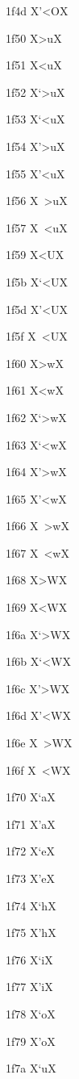 \documentclass[11pt]{article}
\begin{document}
1f4d X{\textgreek{'<O}}X

1f50 X{\textgreek{>u}}X

1f51 X{\textgreek{<u}}X

1f52 X{\textgreek{`>u}}X

1f53 X{\textgreek{`<u}}X

1f54 X{\textgreek{'>u}}X

1f55 X{\textgreek{'<u}}X

1f56 X{\textgreek{~>u}}X

1f57 X{\textgreek{~<u}}X

1f59 X{\textgreek{<U}}X

1f5b X{\textgreek{`<U}}X

1f5d X{\textgreek{'<U}}X

1f5f X{\textgreek{~<U}}X

1f60 X{\textgreek{>w}}X

1f61 X{\textgreek{<w}}X

1f62 X{\textgreek{`>w}}X

1f63 X{\textgreek{`<w}}X

1f64 X{\textgreek{'>w}}X

1f65 X{\textgreek{'<w}}X

1f66 X{\textgreek{~>w}}X

1f67 X{\textgreek{~<w}}X

1f68 X{\textgreek{>W}}X

1f69 X{\textgreek{<W}}X

1f6a X{\textgreek{`>W}}X

1f6b X{\textgreek{`<W}}X

1f6c X{\textgreek{'>W}}X

1f6d X{\textgreek{'<W}}X

1f6e X{\textgreek{~>W}}X

1f6f X{\textgreek{~<W}}X

1f70 X{\textgreek{`a}}X

1f71 X{\textgreek{'a}}X

1f72 X{\textgreek{`e}}X

1f73 X{\textgreek{'e}}X

1f74 X{\textgreek{`h}}X

1f75 X{\textgreek{'h}}X

1f76 X{\textgreek{`i}}X

1f77 X{\textgreek{'i}}X

1f78 X{\textgreek{`o}}X

1f79 X{\textgreek{'o}}X

1f7a X{\textgreek{`u}}X
\end{document}
